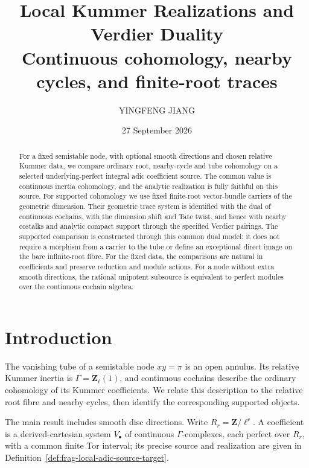 \documentclass[11pt]{article}
\title{Local Kummer Realizations and Verdier Duality\\
\large Continuous cohomology, nearby cycles, and finite-root traces}
\author{YINGFENG JIANG}
\date{27 September 2026}
\theoremstyle{definition}
\theoremstyle{remark}
\begin{document}
\maketitle

\begin{abstract}
For a fixed semistable node, with optional smooth directions and
chosen relative Kummer data, we compare ordinary root, nearby-cycle
and tube cohomology on a selected underlying-perfect integral adic
coefficient source.  The common value is continuous inertia
cohomology, and the analytic realization is fully faithful on this
source.  For supported cohomology we use fixed finite-root
vector-bundle carriers of the geometric dimension.  Their geometric
trace system is identified with the dual of continuous cochains,
with the dimension shift and Tate twist, and hence with nearby
costalks and analytic compact support through the specified Verdier
pairings.  The supported comparison is constructed through this
common dual model; it does not require a morphism from a carrier
to the tube or define an exceptional direct image on the bare
infinite-root fibre.  For the fixed data, the comparisons are natural
in coefficients and preserve reduction and module actions.  For a
node without extra smooth directions, the rational unipotent subsource
is equivalent to perfect modules over the continuous cochain algebra.
\end{abstract}

\section{Introduction}
\label{frag:explicit-three-realization}

The vanishing tube of a semistable node $xy=\pi$ is an open annulus.
Its relative Kummer inertia is $\Gamma=\mathbf Z_\ell(1)$, and
continuous cochains describe the ordinary cohomology of its Kummer
coefficients.  We relate this description to the relative root fibre
and nearby cycles, then identify the corresponding supported objects.

The main result includes smooth disc directions.  Write
$R_r=\mathbf Z/\ell^r$.  A coefficient is a derived-cartesian system
$V_\bullet$ of continuous $\Gamma$-complexes, each perfect over $R_r$,
with a common finite Tor interval; its precise source and realization
are given in Definition~\ref{def:frag-local-adic-source-target}.
\end{document}
